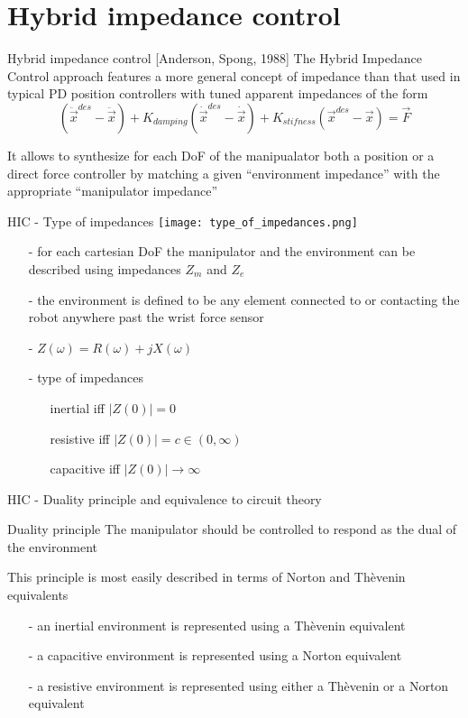 \section{Hybrid impedance control}

\begin{frame}{Hybrid impedance control [Anderson, Spong, 1988]}
  The Hybrid Impedance Control approach features \alert{a more general concept of
  impedance} than that used in typical PD position controllers with tuned
  apparent impedances of the form
  \[
  (\ddot{\vec{x}}^{des} - \ddot{\vec{x}}) + K_{damping} (\dot{\vec{x}}^{des} - \dot{\vec{x}})
  + K_{stifness}(\vec{x}^{des} - \vec{x}) = \vec{F}
  \]
  \par
  It allows to synthesize for each DoF of the manipualator both a position or a \alert{direct
    force} controller by matching a given ``environment impedance'' with the appropriate
  ``manipulator impedance''
\end{frame}

\begin{frame}{HIC - Type of impedances}
  \centering
  \texttt{[image: type\_of\_impedances.png]}
  \begin{itemize}
  \item[-] for each cartesian DoF the manipulator and the environment can be described using impedances $Z_m$ and $Z_e$
  \item[-] the environment is defined to be any element connected
    to or contacting the robot anywhere \alert{past the wrist} force sensor
  \item[-] $Z(\omega) = R(\omega) + j X(\omega)$
  \item[-] type of impedances
    \begin{itemize}
    \item[] inertial iff $|Z(0)| = 0$
    \item[] resistive iff $|Z(0)| = c \in (0, \infty)$
    \item[] capacitive iff $|Z(0)| \rightarrow \infty$
    \end{itemize}
  \end{itemize}
\end{frame}

\begin{frame}{HIC - Duality principle and equivalence to circuit theory}
  \begin{block}{Duality principle}
    The manipulator should be controlled to respond as the dual of the environment
  \end{block}

  This principle is most easily described in terms of Norton and Thèvenin equivalents
  \begin{itemize}
  \item[-] an inertial environment is represented using a Thèvenin equivalent
  \item[-] a capacitive environment is represented using a Norton equivalent
  \item[-] a resistive environment is represented using either a Thèvenin or a Norton equivalent
  \end{itemize}
\end{frame}

